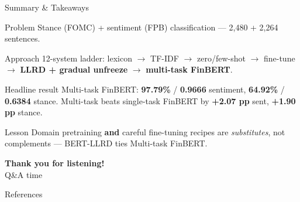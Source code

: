 \documentclass[10pt, aspectratio=169]{beamer}
\begin{document}
\begin{frame}{Summary \& Takeaways}
    \begin{block}{Problem}
        Stance (FOMC) + sentiment (FPB) classification --- 2,480 + 2,264 sentences.
    \end{block}
    \begin{block}{Approach}
        12-system ladder: lexicon $\rightarrow$ TF-IDF $\rightarrow$ zero/few-shot $\rightarrow$ fine-tune $\rightarrow$ \textbf{LLRD + gradual unfreeze} $\rightarrow$ \textbf{multi-task FinBERT}.
    \end{block}
    \begin{block}{Headline result}
        Multi-task FinBERT: \textbf{97.79\%} / \textbf{0.9666} sentiment, \textbf{64.92\%} / \textbf{0.6384} stance. Multi-task beats single-task FinBERT by \textbf{+2.07 pp} sent, \textbf{+1.90 pp} stance.
    \end{block}
    \begin{block}{Lesson}
        Domain pretraining \textbf{and} careful fine-tuning recipes are \textit{substitutes}, not complements --- BERT-LLRD ties Multi-task FinBERT.
    \end{block}
\end{frame}

{
\begin{frame}[plain]
    \vfill
    \centering
    {\color{UNSWDarkBlue}\Huge\textbf{Thank you for listening!}}\\[1em]
    {\color{UNSWDarkBlue}\Large Q\&A time}
    \vfill
\end{frame}
}

\begin{frame}[allowframebreaks]{References}
    \printbibliography[heading=none]
\end{frame}
\end{document}
